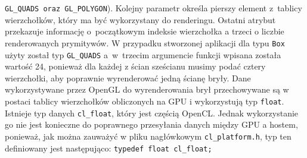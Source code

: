 \verb$GL_QUADS oraz GL_POLYGON$). Kolejny parametr określa pierszy element z~tablicy wierzchołków, który ma być wykorzystany do renderingu. Ostatni atrybut przekazuje informację o~początkowym indeksie wierzchołka a trzeci o liczbie renderowanych prymitywów. W przypadku stworzonej aplikacji dla typu \verb$Box$ użyty został typ \verb$GL_QUADS$ a~w~trzecim argumencie funkcji wpisana została wartość 24, ponieważ dla każdej z ścian sześcianu musimy podać cztery wierzchołki, aby poprawnie wyrenderować jedną ścianę bryły. Dane wykorzystywane przez OpenGL do wyrenderowania brył przechowywane są w postaci tablicy wierzchołków obliczonych na GPU i wykorzystują typ \verb$float$. Istnieje typ danych \verb$cl_float$, który jest częścią OpenCL. Jednak wykorzystanie go nie jest konieczne do poprawnego przesyłania danych między GPU a hostem, ponieważ, jak można zauważyć w pliku nagłówkowym \verb$cl_platform.h$, typ ten definiowany jest następująco: \verb$typedef float cl_float;$
